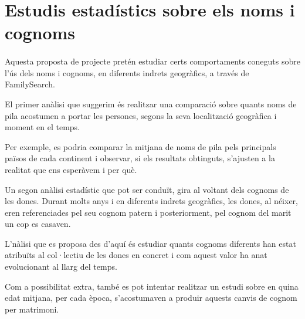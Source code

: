 \section{Estudis estadístics sobre els noms i cognoms}

    \paragraph{}
    Aquesta proposta de projecte pretén estudiar certs comportaments coneguts sobre l'ús dels noms i cognoms, en diferents indrets geogràfics, a través de FamilySearch.

    El primer anàlisi que suggerim és realitzar una comparació sobre quants noms de pila acostumen a portar les persones, segons la seva localització geogràfica i moment en el temps.

    Per exemple, es podria comparar la mitjana de noms de pila pels principals països de cada continent i observar, si els resultats obtinguts, s'ajusten a la realitat que ens esperàvem i per què.

    Un segon anàlisi estadístic que pot ser conduït, gira al voltant dels cognoms de les dones. Durant molts anys i en diferents indrets geogràfics, les dones, al néixer, eren referenciades pel seu cognom patern i posteriorment, pel cognom del marit un cop es casaven.

    L'nàlisi que es proposa des d'aquí és estudiar quants cognoms diferents han estat atribuïts al col·lectiu de les dones en concret i com aquest valor ha anat evolucionant al llarg del temps.

    Com a possibilitat extra, també es pot intentar realitzar un estudi sobre en quina edat mitjana, per cada època, s'acostumaven a produir aquests canvis de cognom per matrimoni.
